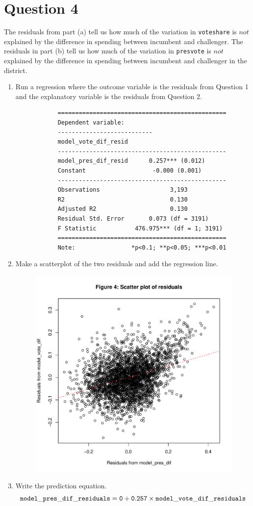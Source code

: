 \documentclass[12pt,letterpaper]{article}
\begin{document}
\newpage	
\section*{Question 4}
\noindent The residuals from part (a) tell us how much of the variation in \texttt{voteshare} is $not$ explained by the difference in spending between incumbent and challenger. The residuals in part (b) tell us how much of the variation in \texttt{presvote} is $not$ explained by the difference in spending between incumbent and challenger in the district.
	\begin{enumerate}
		\item Run a regression where the outcome variable is the residuals from Question 1 and the explanatory variable is the residuals from Question 2.
		
		\begin{verbatim}
		 	================================================
		 	Dependent variable:    
		 	---------------------------
		 	model_vote_dif_resid    
		 	------------------------------------------------
		 	model_pres_dif_resid      0.257*** (0.012)      
		 	Constant                   -0.000 (0.001)       
		 	------------------------------------------------
		 	Observations                    3,193           
		 	R2                              0.130           
		 	Adjusted R2                     0.130           
		 	Residual Std. Error       0.073 (df = 3191)     
		 	F Statistic           476.975*** (df = 1; 3191) 
		 	================================================
		 	Note:                *p<0.1; **p<0.05; ***p<0.01
		 \end{verbatim}  
		
		\item Make a scatterplot of the two residuals and add the regression line. 	
		 
     	\begin{figure}[H]
			\centering
			\includegraphics[width=.55\textwidth]{Q4_2_scatterplot.pdf}
		\end{figure}
		
		\item Write the prediction equation.
		\begin{equation*}
			\tt{model\_pres\_dif\_residuals} = 0 + 0.257 \times \tt{model\_vote\_dif\_residuals}
		\end{equation*}
	\end{enumerate}	
	
\end{document}
